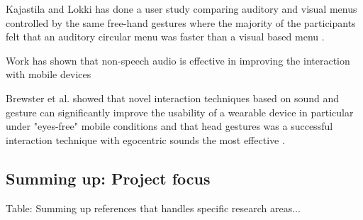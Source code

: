 Kajastila and Lokki has done a user study comparing auditory and visual menus controlled by the same free-hand gestures where the majority of the participants felt that an auditory circular menu was faster than a visual based menu \cite{kajastila_interaction_2013}.

Work has shown that non-speech audio is effective in improving the interaction with mobile devices \cite{pirhonen_gestural_2002, sawhney_nomadic_2000}


Brewster et al. showed that novel interaction techniques based on sound and gesture can significantly improve the usability of a wearable device in particular under "eyes-free" mobile conditions and that head gestures was a successful interaction technique with egocentric sounds the most effective \cite{brewster_multimodaleyes-freeinteraction_2003}.

\subsection{Summing up: Project focus}
Table: Summing up references that handles specific research areas...














